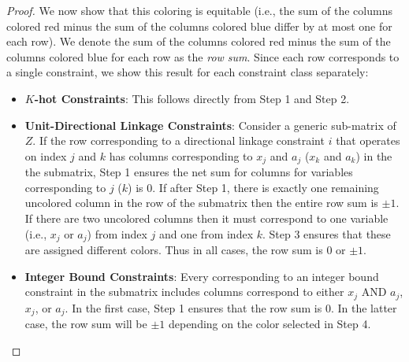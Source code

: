 \begin{proof}
We now show that this coloring is equitable (i.e., the sum of the columns colored red minus the sum of the columns colored blue differ by at most one for each row). We denote the sum of the columns colored red minus the sum of the columns colored blue for each row as the \emph{row sum}. Since each row corresponds to a single constraint, we show this result for each constraint class separately:
\begin{itemize}
    \item \textbf{$K$-hot Constraints}: This follows directly from Step 1 and Step 2.
    \item \textbf{Unit-Directional Linkage Constraints}: Consider a generic sub-matrix of $Z$. If the row corresponding to a directional linkage constraint $i$ that operates on index $j$ and $k$ has columns corresponding to $x_j$ and $a_j$ ($x_k$ and $a_k$) in the the submatrix, Step 1 ensures the net sum for columns for variables corresponding to $j$ ($k$) is 0. If after Step 1, there is exactly one remaining uncolored column in the row of the submatrix then the entire row sum is $\pm 1$. If there are two uncolored columns then it must correspond to one variable (i.e., $x_j$ or $a_j$) from index $j$ and one from index $k$. Step 3 ensures that these are assigned different colors. Thus in all cases, the row sum is $0$ or $\pm 1$.
    \item \textbf{Integer Bound Constraints}: Every corresponding to an integer bound constraint in the submatrix includes columns correspond to either $x_j$ AND $a_j$, $x_j$, or $a_j$. In the first case, Step 1 ensures that the row sum is $0$. In the latter case, the row sum will be $\pm 1$ depending on the color selected in Step 4.
\end{itemize}

\end{proof}

